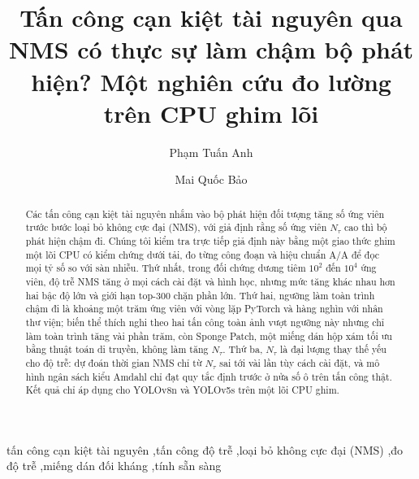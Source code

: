 \documentclass[a4paper,fleqn]{cas-dc}
\newcommand{\todo}[1]{\textcolor{red}{[TODO: #1]}}
\newcommand{\Ntau}{N_{\tau}}
\begin{document}
\let\WriteBookmarks\relax
\def\floatpagepagefraction{1}
\def\textpagefraction{.001}
\title[mode=title]{Tấn công cạn kiệt tài nguyên qua NMS có thực sự làm chậm bộ phát hiện? Một nghiên cứu đo lường trên CPU ghim lõi}
\author[1]{Phạm Tuấn Anh}
\author[1]{Mai Quốc Bảo}
\nonumnote{Tác giả liên hệ, email liên hệ và ORCID: \todo{nhóm quyết định}.}

\begin{abstract}
Các tấn công cạn kiệt tài nguyên nhắm vào bộ phát hiện đối tượng tăng số ứng viên trước bước loại bỏ không cực đại (NMS), với giả định rằng số ứng viên $\Ntau$ cao thì bộ phát hiện chậm đi. Chúng tôi kiểm tra trực tiếp giả định này bằng một giao thức ghim một lõi CPU có kiểm chứng dưới tải, đo từng công đoạn và hiệu chuẩn A/A để đọc mọi tỷ số so với sàn nhiễu. Thứ nhất, trong đối chứng dương tiêm $10^2$ đến $10^4$ ứng viên, độ trễ NMS tăng ở mọi cách cài đặt và hình học, nhưng mức tăng khác nhau hơn hai bậc độ lớn và giới hạn top-300 chặn phần lớn. Thứ hai, ngưỡng làm toàn trình chậm đi là khoảng một trăm ứng viên với vòng lặp PyTorch và hàng nghìn với nhân thư viện; biến thể thích nghi theo hai tấn công toàn ảnh vượt ngưỡng này nhưng chỉ làm toàn trình tăng vài phần trăm, còn Sponge Patch, một miếng dán hộp xám tối ưu bằng thuật toán di truyền, không làm tăng $\Ntau$. Thứ ba, $\Ntau$ là đại lượng thay thế yếu cho độ trễ: dự đoán thời gian NMS chỉ từ $\Ntau$ sai tới vài lần tùy cách cài đặt, và mô hình ngân sách kiểu Amdahl chỉ đạt quy tắc định trước ở nửa số ô trên tấn công thật. Kết quả chỉ áp dụng cho YOLOv8n và YOLOv5s trên một lõi CPU ghim.
\end{abstract}

\begin{keywords}[Từ khóa]
tấn công cạn kiệt tài nguyên \sep tấn công độ trễ \sep loại bỏ không cực đại (NMS) \sep đo độ trễ \sep miếng dán đối kháng \sep tính sẵn sàng
\end{keywords}
\maketitle
\end{document}
